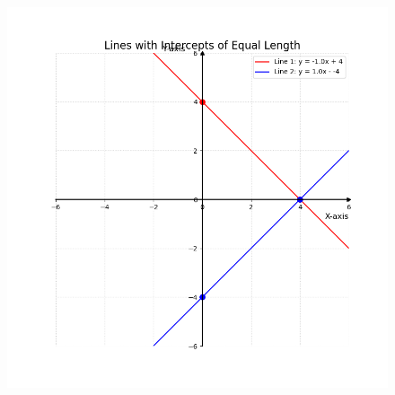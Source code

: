 \documentclass[journal]{IEEEtran}
\begin{document}
	
	\begin{figure}[H]
		\centering
		\includegraphics[width = 0.8\columnwidth]{Figure_1.png}
		\caption*{}
		\label{fig1}
	\end{figure}
	
\end{document}
